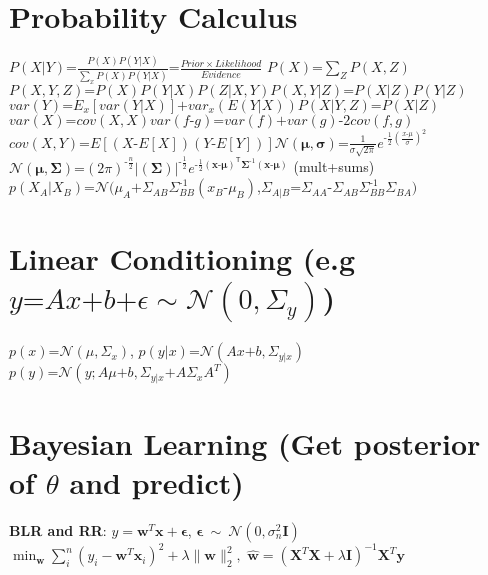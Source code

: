 \documentclass[a4paper, 11pt, landscape]{article}
\begin{document}
\begin{multicols*}{3}

\section{Probability Calculus}
$P(X|Y) \text{=} \frac{P(X)P(Y|X)}{\sum_{x}P(X)P(Y|X)}\text{=}\frac{Prior \times Likelihood}{Evidence}$ \space $P(X)\text{=}\sum\limits_{Z} P(X,Z)$
\newline $P(X,Y,Z)\text{=}P(X)P(Y|X)P(Z|X,Y)$\space\space$P(X,Y|Z)\text{=}P(X|Z)P(Y|Z)$
\newline $var(Y)\text{=}E_x[var(Y|X)]\text{+}var_x(E(Y|X))$\space\space$P(X|Y,Z)\text{=}P(X|Z)$
\newline $var(X)\text{=}cov(X,X)$\space\space$var(f\text{-}g)\text{=}var(f)\text{+}var(g)\text{-}2cov(f,g)$
\newline $cov(X,Y)\text{=}E[(X\text{-}E[X])(Y\text{-}E[Y])]$\space\space$\mathcal{N}(\boldsymbol\mu,\boldsymbol\sigma)\text{=}\frac{1}{\sigma \sqrt{2\pi} } e^{\text{-}\frac{1}{2}\left(\frac{x\text{-}\mu}{\sigma}\right)^2}$ 
\newline $\mathcal{N}(\boldsymbol\mu,\boldsymbol\Sigma)\text{=}(2\pi)^{\text{-}\frac{n}{2}}|(\boldsymbol\Sigma)|^{\text{-}\frac{1}{2}}e^{\text{-}\frac{1}{2}(\mathbf{x}\text{-}\boldsymbol\mu)^{{{\!\mathsf{T}}}} \boldsymbol\Sigma^{\text{-}1}(\mathbf{x}\text{-}\boldsymbol\mu)}$ \space\space (mult+sums)
\newline $p(X_A|X_B)\text{=}\mathcal{N}(\mu_A\text{+}\Sigma_{AB}\Sigma_{BB}^{\text{-}1}(x_B\text{-}\mu_B)$,\space\space$\Sigma_{A|B}\text{=}\Sigma_{AA}\text{-}\Sigma_{AB}\Sigma_{BB}^{\text{-}1}\Sigma_{BA})$

\section{Linear Conditioning (e.g $y\text{=}Ax\text{+}b\text{+}\epsilon\sim\mathcal{N}(0,\Sigma_y)$)}
$p(x)\text{=} \mathcal{N}(\mu,\Sigma_x)$,\space\space\space
$p(y|x)\text{=}\mathcal{N}(Ax\text{+}b,\Sigma_{y|x})$
\newline $p(y)\text{=}\mathcal{N} (y;A\mu\text{+}b,\Sigma_{y|x}\text{+}A\Sigma_{x}A^T)$

\section{Bayesian Learning (Get posterior of $\theta$ and predict)}
\textbf{BLR and RR}: $y = \mathbf{w}^T \mathbf{x} + \mathbf{\epsilon}$, $ \mathbf{\epsilon} \ \sim\ \mathcal{N}(0, \sigma_n^2 \boldsymbol I)$
\newline$\min _{\mathbf{w}} \sum_{i}^{n}\left(y_{i}-\mathbf{w}^{T} \mathbf{x}_{i}\right)^{2}+\lambda\|\mathbf{w}\|_{2}^{2},$
        \space $\hat{\mathbf{w}}=\left(\mathbf{X}^{T} \mathbf{X}+\lambda \mathbf{I}\right)^{-1} \mathbf{X}^{T} \mathbf{y}$


\end{multicols*}
\end{document}

